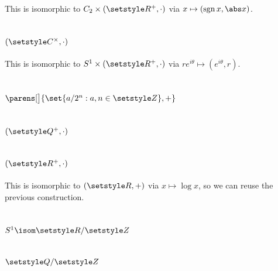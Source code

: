 \documentclass[fleqn,a4paper,11pt]{article}
\begin{document}
This is isomorphic to \(C_2 \times (\Reals^+, \cdot)\) via
\(x \mapsto (\sgn x, \abs x)\).

\section{\((\Complex^\times, \cdot)\)}

This is isomorphic to \(S^1 \times (\Reals^+, \cdot)\) via
\(re^{i\theta} \mapsto (e^{i\theta}, r)\).

\section{\(\parens[\big]{\set{a / 2^n : a, n \in \Integers}, +}\)}

\section{\((\Rationals^+, \cdot)\)}

\section{\((\Reals^+, \cdot)\)}

This is isomorphic to \((\Reals, +)\) via \(x \mapsto \log x\), so we can reuse
the previous construction.

\section{\(S^1 \isom \Reals / \Integers\)}

\section{\(\Rationals / \Integers\)}
\end{document}
